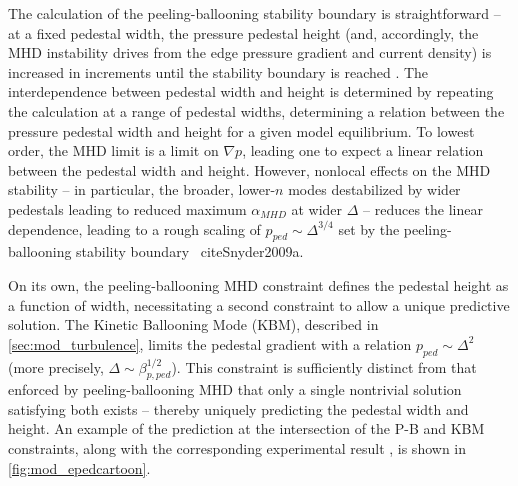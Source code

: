 The calculation of the peeling-ballooning stability boundary is straightforward -- at a fixed pedestal width, the pressure pedestal height (and, accordingly, the MHD instability drives from the edge pressure gradient and current density) is increased in increments until the stability boundary is reached \cite{Snyder2009}.  The interdependence between pedestal width and height is determined by repeating the calculation at a range of pedestal widths, determining a relation between the pressure pedestal width and height for a given model equilibrium.  To lowest order, the MHD limit is a limit on $\nabla p$, leading one to expect a linear relation between the pedestal width and height.  However, nonlocal effects on the MHD stability -- in particular, the broader, lower-$n$ modes destabilized by wider pedestals leading to reduced maximum $\alpha_{MHD}$ at wider $\Delta$ -- reduces the linear dependence, leading to a rough scaling of $p_{ped} \sim \Delta^{3/4}$ set by the peeling-ballooning stability boundary \
cite{Snyder2009a}.

On its own, the peeling-ballooning MHD constraint defines the pedestal height as a function of width, necessitating a second constraint to allow a unique predictive solution.  The Kinetic Ballooning Mode (KBM), described in \cref{sec:mod_turbulence}, limits the pedestal gradient with a relation $p_{ped} \sim \Delta^2$ (more precisely, $\Delta \sim \beta_{p,ped}^{1/2}$).  This constraint is sufficiently distinct from that enforced by peeling-ballooning MHD  that only a single nontrivial solution satisfying both exists -- thereby uniquely predicting the pedestal width and height.  An example of the prediction at the intersection of the P-B and KBM constraints, along with the corresponding experimental result \cite{Snyder2011}, is shown in \cref{fig:mod_epedcartoon}.


